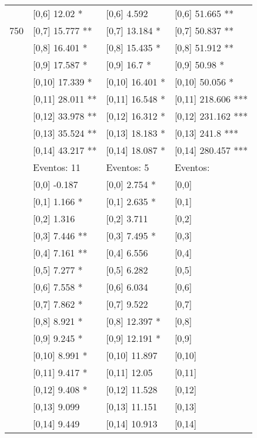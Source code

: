 \begin{table}
\begin{tabular}[t]{llll}
 & {}[0,6] 12.02 * & {}[0,6] 4.592 & {}[0,6] 51.665 **\\
750 & {}[0,7] 15.777 ** & {}[0,7] 13.184 * & {}[0,7] 50.837 **\\
\addlinespace
 & {}[0,8] 16.401 * & {}[0,8] 15.435 * & {}[0,8] 51.912 **\\
 & {}[0,9] 17.587 * & {}[0,9] 16.7 * & {}[0,9] 50.98 *\\
 & {}[0,10] 17.339 * & {}[0,10] 16.401 * & {}[0,10] 50.056 *\\
 & {}[0,11] 28.011 ** & {}[0,11] 16.548 * & {}[0,11] 218.606 ***\\
 & {}[0,12] 33.978 ** & {}[0,12] 16.312 * & {}[0,12] 231.162 ***\\
\addlinespace
 & {}[0,13] 35.524 ** & {}[0,13] 18.183 * & {}[0,13] 241.8 ***\\
 & {}[0,14] 43.217 ** & {}[0,14] 18.087 * & {}[0,14] 280.457 ***\\
 & Eventos:  11 & Eventos:  5 & Eventos:\\
 & {}[0,0] -0.187 & {}[0,0] 2.754 * & {}[0,0]\\
 & {}[0,1] 1.166 * & {}[0,1] 2.635 * & {}[0,1]\\
\addlinespace
 & {}[0,2] 1.316 & {}[0,2] 3.711 & {}[0,2]\\
 & {}[0,3] 7.446 ** & {}[0,3] 7.495 * & {}[0,3]\\
 & {}[0,4] 7.161 ** & {}[0,4] 6.556 & {}[0,4]\\
 & {}[0,5] 7.277 * & {}[0,5] 6.282 & {}[0,5]\\
 & {}[0,6] 7.558 * & {}[0,6] 6.034 & {}[0,6]\\
\addlinespace
1000 & {}[0,7] 7.862 * & {}[0,7] 9.522 & {}[0,7]\\
 & {}[0,8] 8.921 * & {}[0,8] 12.397 * & {}[0,8]\\
 & {}[0,9] 9.245 * & {}[0,9] 12.191 * & {}[0,9]\\
 & {}[0,10] 8.991 * & {}[0,10] 11.897 & {}[0,10]\\
 & {}[0,11] 9.417 * & {}[0,11] 12.05 & {}[0,11]\\
\addlinespace
 & {}[0,12] 9.408 * & {}[0,12] 11.528 & {}[0,12]\\
 & {}[0,13] 9.099 & {}[0,13] 11.151 & {}[0,13]\\
 & {}[0,14] 9.449 & {}[0,14] 10.913 & {}[0,14]\\
\bottomrule
\end{tabular}
\end{table}
